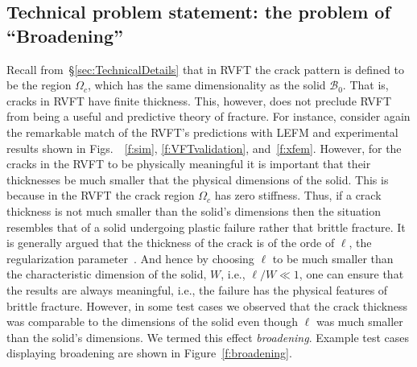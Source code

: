 \documentclass[10pt,letterpaper]{article}
\begin{document}
  \subsection{Technical problem statement: the problem of ``Broadening''}
  \label{sec:Broadening}
 Recall from~\S\ref{sec:TechnicalDetails} that in RVFT the crack pattern is defined to be  the region $\Omega_c$, which has the same dimensionality as the solid $\mathcal{B}_0$.  That is, cracks in RVFT have finite thickness. This, however, does not  preclude RVFT from being a useful and predictive theory of fracture. For instance, consider again the remarkable match of the RVFT's predictions with LEFM and experimental results shown in Figs.~~\ref{f:sim}, \ref{f:VFTvalidation}, and~\ref{f:xfem}. However, for the cracks in the RVFT  to be  physically meaningful it is important that their thicknesses be much smaller that the physical dimensions of the solid.  This is because in the RVFT the crack region $\Omega_{c}$ has zero stiffness. Thus, if a crack thickness is not much smaller than the solid's dimensions then the situation resembles that of a solid undergoing plastic failure rather that brittle fracture. It is generally argued that the thickness of the crack is of the  orde of  $\ell$, the regularization parameter~\cite{amiri2014phase}. And hence by choosing $\ell$ to be much smaller than the characteristic dimension of the solid, $W$, i.e., $\ell/W\ll 1$, one can ensure that the results are always meaningful, i.e., the failure has the physical features of  brittle fracture. However, in some test cases we observed that the crack thickness was comparable to the dimensions of the solid even though $\ell$ was much smaller than the solid's dimensions. We termed this effect \textit{broadening}.   Example test cases displaying broadening are shown in  Figure~\ref{f:broadening}.%
\end{document}
